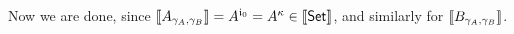 \documentclass{article}
\begin{document}

Now we are done, since %
$\llbracket A_{\gamma_A, \gamma_B} \rrbracket = A^{\mathfrak{i}_0} = A^{\kappa} \in
\llbracket \mathsf{Set} \rrbracket$, and similarly for $\llbracket B_{\gamma_A, \gamma_B} \rrbracket$.






%
\end{document}
